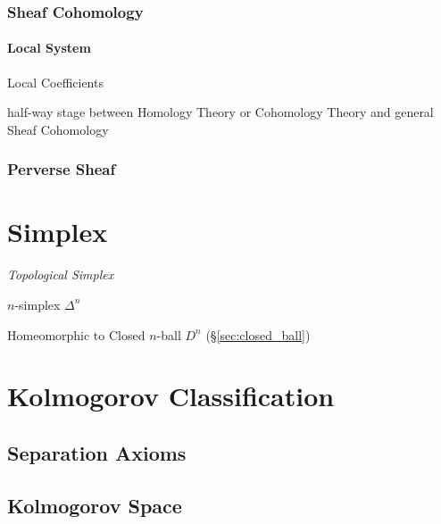 \subsubsection{Sheaf Cohomology}\label{sec:sheaf_cohomology}

\paragraph{Local System}\label{sec:local_system}\hfill

Local Coefficients

half-way stage between Homology Theory or Cohomology Theory and general Sheaf
Cohomology



\subsubsection{Perverse Sheaf}\label{sec:perverse_sheaf}



\section{Simplex}\label{sec:simplex}

\emph{Topological Simplex}

$n$-simplex $\Delta^n$

Homeomorphic to Closed $n$-ball $D^n$ (\S\ref{sec:closed_ball})



\section{Kolmogorov Classification}\label{sec:kolmogorov_classification}

\subsection{Separation Axioms}\label{sec:separation_axioms}

\subsection{Kolmogorov Space}\label{sec:kolmogorov_space}

